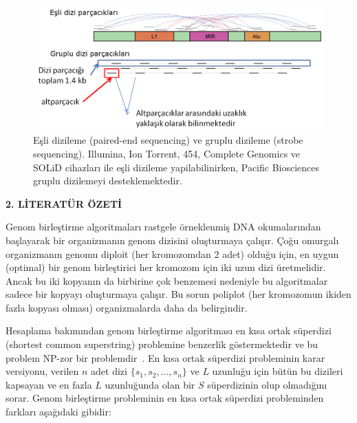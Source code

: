 \documentclass[11pt]{article}
\begin{document}
\begin{figure}[htb]
\begin{center}
  \includegraphics[scale=0.75]{strobe.png}
\end{center}
\caption{Eşli dizileme (paired-end sequencing) ve gruplu dizileme (strobe sequencing). Illumina, Ion Torrent, 454, Complete Genomics ve SOLiD cihazları ile eşli dizileme yapilabilinirken, Pacific Biosciences gruplu dizilemeyi desteklemektedir.}
\label{fig:strobe}
\end{figure}


\noindent

\clearpage
\begin{center}
{\bf \Large 2. LİTERATÜR ÖZETİ}
\end{center}

Genom birleştirme algoritmaları rastgele örneklenmiş DNA okumalarından başlayarak 
bir organizmanın genom dizisini oluşturmaya çalışır. Çoğu omurgalı organizmanın genomu diploit (her kromozomdan 2 adet) olduğu için, en uygun (optimal) bir genom birleştirici her kromozom için iki uzun dizi üretmelidir. Ancak bu iki kopyanın da birbirine çok benzemesi nedeniyle bu algoritmalar sadece bir kopyayı oluşturmaya çalışır. Bu sorun poliplot (her kromozomun ikiden fazla kopyası olması)
organizmalarda daha da belirgindir. 

Hesaplama bakımından genom birleştirme algoritması en kısa ortak süperdizi 
(shortest common superstring) problemine benzerlik göstermektedir 
ve bu problem NP-zor bir problemdir~\cite{Raeihae1981}. En kısa ortak süperdizi probleminin karar versiyonu,
verilen $n$ adet dizi $\{s_1,s_2,\ldots, s_n \}$ ve $L$ uzunluğu için bütün bu dizileri
kapsayan ve en fazla $L$ uzunluğunda olan bir $S$ süperdizinin olup olmadığını sorar.
Genom birleştirme probleminin en kısa ortak süperdizi probleminden farkları aşağıdaki gibidir:
\end{document}
